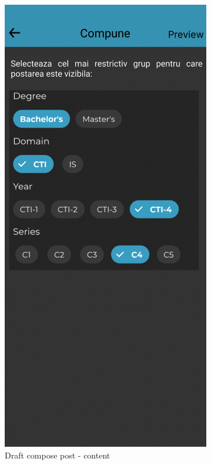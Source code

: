 \begin{figure}[!ht]
\begin{minipage}[b]{0.32\textwidth}
        \caption{Draft compose post - content}
        \label{4:fig:draft-create-post-title-body}
    \end{minipage}
    \hfill
    \begin{minipage}[b]{0.32\textwidth}
        \captionsetup{justification=centering}
        \includegraphics[width=\textwidth]{figures/app/initial/compose-step-2-draft.png}

\end{minipage}
\end{figure}
